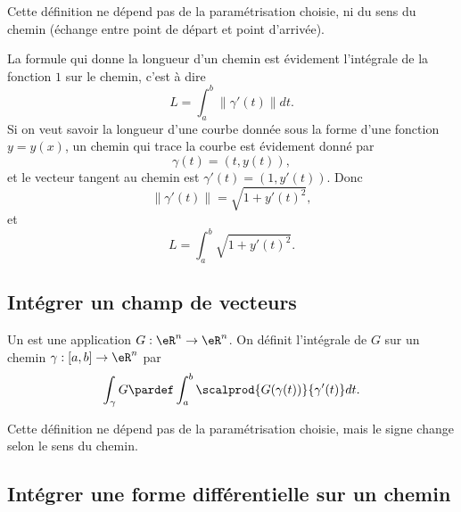 \begin{remark}
  Cette définition ne dépend pas de la paramétrisation choisie, ni du
  sens du chemin (échange entre point de départ et point d'arrivée).
\end{remark}

La formule qui donne la longueur d'un chemin est évidement l'intégrale de la fonction $1$ sur le chemin, c'est à dire
\begin{equation}
	L=\int_a^b\| \gamma'(t) \|dt.
\end{equation}
Si on veut savoir la longueur d'une courbe donnée sous la forme d'une fonction $y=y(x)$, un chemin qui trace la courbe est évidement donné par
\begin{equation}
	\gamma(t)=(t,y(t)),
\end{equation}
et le vecteur tangent au chemin est $\gamma'(t)=(1,y'(t))$. Donc
\begin{equation}
	\| \gamma'(t) \|=\sqrt{1+y'(t)^2},
\end{equation}
et 
\begin{equation}			\label{EqLongFonction}
	L=\int_a^b\sqrt{1+y'(t)^2}.
\end{equation}

\subsection{Intégrer un champ de vecteurs}
Un  est une application $G : \eR^n \to
\eR^n$. On définit l'intégrale de $G$ sur un chemin $\gamma : [a,b]
\to \eR^n$ par
\begin{equation*}
  \int_\gamma G \pardef \int_a^b \scalprod {G(\gamma(t))}{\gamma^\prime(t)} d t.
\end{equation*}

\begin{remark}
  Cette définition ne dépend pas de la paramétrisation choisie, mais
  le signe change selon le sens du chemin.
\end{remark}

\subsection{Intégrer une forme différentielle sur un chemin}

